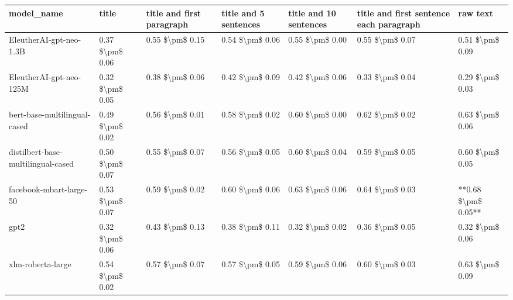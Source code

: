 \begin{tabular}{lllllll}
\toprule
                        model\_name &           title & title and first paragraph & title and 5 sentences & title and 10 sentences & title and first sentence each paragraph &            raw text \\
\midrule
           EleutherAI-gpt-neo-1.3B & 0.37 \$\textbackslash pm\$ 0.06 &           0.55 \$\textbackslash pm\$ 0.15 &       0.54 \$\textbackslash pm\$ 0.06 &        0.55 \$\textbackslash pm\$ 0.00 &                         0.55 \$\textbackslash pm\$ 0.07 &     0.51 \$\textbackslash pm\$ 0.09 \\
           EleutherAI-gpt-neo-125M & 0.32 \$\textbackslash pm\$ 0.05 &           0.38 \$\textbackslash pm\$ 0.06 &       0.42 \$\textbackslash pm\$ 0.09 &        0.42 \$\textbackslash pm\$ 0.06 &                         0.33 \$\textbackslash pm\$ 0.04 &     0.29 \$\textbackslash pm\$ 0.03 \\
      bert-base-multilingual-cased & 0.49 \$\textbackslash pm\$ 0.02 &           0.56 \$\textbackslash pm\$ 0.01 &       0.58 \$\textbackslash pm\$ 0.02 &        0.60 \$\textbackslash pm\$ 0.00 &                         0.62 \$\textbackslash pm\$ 0.02 &     0.63 \$\textbackslash pm\$ 0.06 \\
distilbert-base-multilingual-cased & 0.50 \$\textbackslash pm\$ 0.07 &           0.55 \$\textbackslash pm\$ 0.07 &       0.56 \$\textbackslash pm\$ 0.05 &        0.60 \$\textbackslash pm\$ 0.04 &                         0.59 \$\textbackslash pm\$ 0.05 &     0.60 \$\textbackslash pm\$ 0.05 \\
           facebook-mbart-large-50 & 0.53 \$\textbackslash pm\$ 0.07 &           0.59 \$\textbackslash pm\$ 0.02 &       0.60 \$\textbackslash pm\$ 0.06 &        0.63 \$\textbackslash pm\$ 0.06 &                         0.64 \$\textbackslash pm\$ 0.03 & **0.68 \$\textbackslash pm\$ 0.05** \\
                              gpt2 & 0.32 \$\textbackslash pm\$ 0.06 &           0.43 \$\textbackslash pm\$ 0.13 &       0.38 \$\textbackslash pm\$ 0.11 &        0.32 \$\textbackslash pm\$ 0.02 &                         0.36 \$\textbackslash pm\$ 0.05 &     0.32 \$\textbackslash pm\$ 0.06 \\
                 xlm-roberta-large & 0.54 \$\textbackslash pm\$ 0.02 &           0.57 \$\textbackslash pm\$ 0.07 &       0.57 \$\textbackslash pm\$ 0.05 &        0.59 \$\textbackslash pm\$ 0.06 &                         0.60 \$\textbackslash pm\$ 0.03 &     0.63 \$\textbackslash pm\$ 0.09 \\
\bottomrule
\end{tabular}

